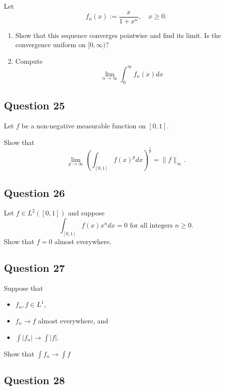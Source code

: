 \documentclass[12pt]{article}
\providecommand{\tightlist}{%
  \setlength{\itemsep}{0pt}\setlength{\parskip}{0pt}}
\begin{document}
Let \[
f_{n}(x):=\frac{x}{1+x^{n}}, \quad x \geq 0.
\]

\begin{enumerate}
\def\labelenumi{\alph{enumi}.}
\item
  Show that this sequence converges pointwise and find its limit. Is the
  convergence uniform on \([0, \infty)\)?
\item
  Compute \[
  \lim _{n \rightarrow \infty} \int_{0}^{\infty} f_{n}(x) d x
  \]
\end{enumerate}

\hypertarget{question-25-1}{%
\subsection{Question 25}\label{question-25-1}}

Let \(f\) be a non-negative measurable function on \([0, 1]\).

Show that \[
\lim _{p \rightarrow \infty}\left(\int_{[0,1]} f(x)^{p} d x\right)^{\frac{1}{p}}=\|f\|_{\infty}.
\]

\hypertarget{question-26-1}{%
\subsection{Question 26}\label{question-26-1}}

Let \(f\in L^2([0, 1])\) and suppose \[
\int_{[0,1]} f(x) x^{n} d x=0 \text { for all integers } n \geq 0.
\] Show that \(f = 0\) almost everywhere.

\hypertarget{question-27-1}{%
\subsection{Question 27}\label{question-27-1}}

Suppose that

\begin{itemize}
\tightlist
\item
  \(f_n, f \in L^1\),
\item
  \(f_n \to f\) almost everywhere, and
\item
  \(\int\left|f_{n}\right| \rightarrow \int|f|\).
\end{itemize}

Show that \(\int f_{n} \rightarrow \int f\)

\hypertarget{question-28-1}{%
\subsection{Question 28}\label{question-28-1}}
\end{document}
